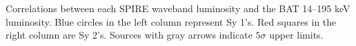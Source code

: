 \label{fig:lum_spire_BAT} Correlations between each SPIRE waveband luminosity and the BAT 14--195 keV luminosity. Blue circles in the left column represent Sy 1's. Red squares in the right column are Sy 2's. Sources with gray arrows indicate $5\sigma$ upper limits.
  